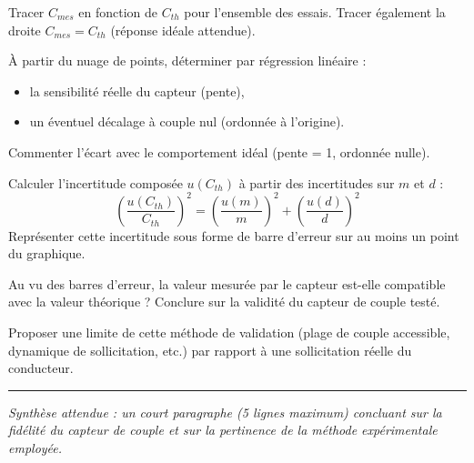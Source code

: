  Tracer $C_{mes}$ en fonction de $C_{th}$ pour l'ensemble des essais. Tracer également la droite $C_{mes} = C_{th}$ (réponse idéale attendue).
 
 À partir du nuage de points, déterminer par régression linéaire :
\begin{itemize}
\item la sensibilité réelle du capteur (pente),
\item un éventuel décalage à couple nul (ordonnée à l'origine).
\end{itemize}
Commenter l'écart avec le comportement idéal (pente = 1, ordonnée nulle).
 
 Calculer l'incertitude composée $u(C_{th})$ à partir des incertitudes sur $m$ et $d$ :
\begin{equation}
\left(\frac{u(C_{th})}{C_{th}}\right)^2 = \left(\frac{u(m)}{m}\right)^2 + \left(\frac{u(d)}{d}\right)^2
\end{equation}
Représenter cette incertitude sous forme de barre d'erreur sur au moins un point du graphique.
 
 Au vu des barres d'erreur, la valeur mesurée par le capteur est-elle compatible avec la valeur théorique ? Conclure sur la validité du capteur de couple testé.
 
 Proposer une limite de cette méthode de validation (plage de couple accessible, dynamique de sollicitation, etc.) par rapport à une sollicitation réelle du conducteur.
 
\vspace{1em}
\hrule
\vspace{0.5em}
\noindent\textit{Synthèse attendue : un court paragraphe (5 lignes maximum) concluant sur la fidélité du capteur de couple et sur la pertinence de la méthode expérimentale employée.}
 


